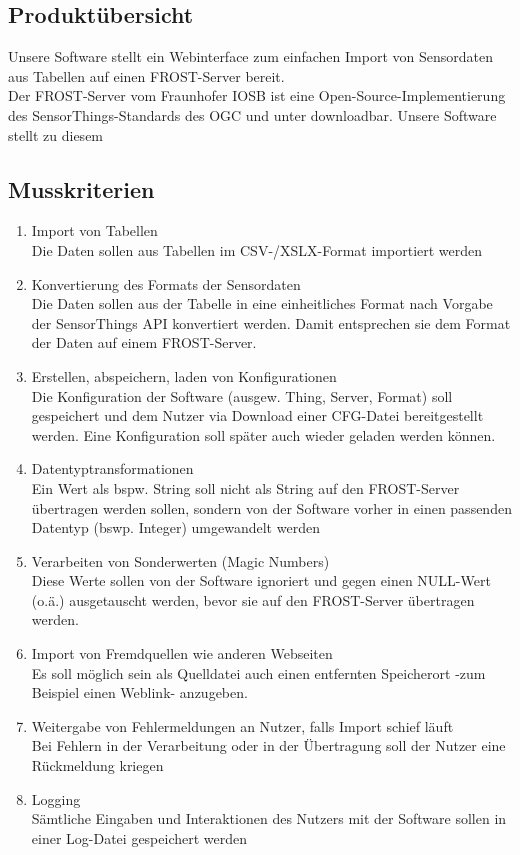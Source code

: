 \documentclass[12 pt]{article}
\begin{document}
\subsection{Produktübersicht}
Unsere Software stellt ein Webinterface zum einfachen Import von Sensordaten aus Tabellen auf einen FROST-Server bereit. \\
Der FROST-Server vom Fraunhofer IOSB ist eine Open-Source-Implementierung des SensorThings-Standards des OGC und unter %
downloadbar. Unsere Software stellt zu diesem 


\subsection{Musskriterien}
\begin{enumerate}
\item Import von Tabellen \\
	Die Daten sollen aus Tabellen im CSV-/XSLX-Format importiert werden
\item Konvertierung des Formats der Sensordaten \\
	Die Daten sollen aus der Tabelle in eine einheitliches Format nach Vorgabe der SensorThings API konvertiert werden. Damit entsprechen sie dem Format der Daten auf einem FROST-Server.
\item Erstellen, abspeichern, laden von Konfigurationen \\
	Die Konfiguration der Software (ausgew. Thing, Server, Format) soll gespeichert und dem Nutzer via Download einer CFG-Datei bereitgestellt werden. Eine Konfiguration soll später auch wieder geladen werden können.
\item Datentyptransformationen \\
	Ein Wert als bspw. String soll nicht als String auf den FROST-Server übertragen werden sollen, sondern von der Software vorher in einen passenden Datentyp (bswp. Integer) umgewandelt werden
\item Verarbeiten von Sonderwerten (Magic Numbers) \\
	Diese Werte sollen von der Software ignoriert und gegen einen NULL-Wert (o.ä.) ausgetauscht werden, bevor sie auf den FROST-Server übertragen werden.
\item Import von Fremdquellen wie anderen Webseiten \\
	Es soll möglich sein als Quelldatei auch einen entfernten Speicherort -zum Beispiel einen Weblink- anzugeben.
\item Weitergabe von Fehlermeldungen an Nutzer, falls Import schief läuft \\
	Bei Fehlern in der Verarbeitung oder in der Übertragung soll der Nutzer eine Rückmeldung kriegen
\item Logging \\
	Sämtliche Eingaben und Interaktionen des Nutzers mit der Software sollen in einer Log-Datei gespeichert werden
\end{enumerate}
\end{document}
